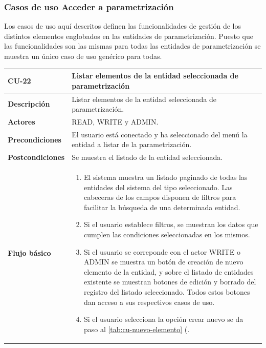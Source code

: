\subsubsection{Casos de uso Acceder a parametrización} 
\label{sub:cu-parametrizacion}

Los casos de uso aquí descritos definen las funcionalidades de gestión de los distintos elementos englobados en las entidades de parametrización. Puesto que las funcionalidades son las mismas para todas las entidades de parametrización se muestra un único caso de uso genérico para todas. 

\begin{table} [H]
    \centering
    \setlength{\leftmargini}{0.4cm}
	\resizebox{15cm}{!} { %
    \begin{tabular}{| m{3cm} | m{12cm} |}   
    \hline
	  \textbf{CU-22} & \textbf{Listar elementos de la entidad seleccionada de parametrización} \\\hline
	  \textbf{Descripción} & Listar elementos de la entidad seleccionada de parametrización. \\\hline
	  \textbf{Actores} & READ, WRITE y ADMIN. \\\hline
	  \textbf{Precondiciones} & El usuario está conectado y ha seleccionado del menú la entidad a listar de la parametrización. \\\hline
	  \textbf{Postcondiciones} & Se muestra el listado de la entidad seleccionada. \\\hline
	  \textbf{Flujo básico} & 
		\begin{enumerate}
	  	\item El sistema muestra un listado paginado de todas las entidades del sistema del tipo seleccionado. Las
cabeceras de los campos disponen de filtros para facilitar la búsqueda de una determinada entidad.
		\item Si el usuario establece filtros, se muestran los datos que cumplen las condiciones seleccionadas en los mismos.
		\item Si el usuario se correponde con el actor WRITE o ADMIN se muestra un botón de creación de nuevo elemento de la entidad, y sobre el listado de entidades existente se muestran botones de edición y borrado del registro del listado seleccionado. Todos estos botones dan acceso a sus respectivos casos de uso.
		\item Si el usuario selecciona la opción crear nuevo se da paso al \ref{tab:cu-nuevo-elemento} (\pageref{tab:cu-nuevo-elemento}.

\end{enumerate}
\end{tabular}}
\end{table}
